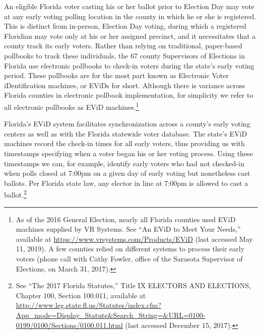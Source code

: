 \documentclass[12pt,titlepage]{article}
\begin{document}
An eligible Florida voter casting his or her ballot prior to Election
Day may vote at any early voting polling location in the county in
which he or she is registered. This is distinct from in-person,
Election Day voting, during which a registered Floridian may vote only
at his or her assigned precinct, and it necessitates that a county
track its early voters. Rather than relying on traditional,
paper-based pollbooks to track these individuals, the 67 county
Supervisors of Elections in Florida use electronic pollbooks to
check-in voters during the state's early voting period. These
pollbooks are for the most part known as Electronic Voter
iDentification machines, or EViDs for short. Although there is
variance across Florida counties in electronic pollbook
implementation, for simplicity we refer to all electronic pollbooks as
EViD machines.\footnote{As of the 2016 General Election, nearly all
  Florida counties used EViD machines supplied by VR Systems. See ``An
  EViD to Meet Your Needs,'' available at
  \url{https://www.vrsystems.com/Products/EViD} (last accessed May 11,
  2019).  A few counties relied on different systems to process their
  early voters (phone call with Cathy Fowler, office of the Sarasota
  Supervisor of Elections, on March 31, 2017).}




Florida's EViD system facilitates synchronization across a county's
early voting centers as well as with the Florida statewide voter
database.  The state's EViD machines record the check-in times for all
early voters, thus providing us with \mbox{timestamps} specifying when
a voter began his or her voting process.  Using these timestamps we
can, for example, identify early voters who had not checked-in when
polls closed at 7:00pm on a given day of early voting but nonetheless
cast ballots. Per Florida state law, any elector in line at 7:00pm is
allowed to cast a ballot.\footnote{See ``The 2017 Florida Statutes,''
  Title IX ELECTORS AND ELECTIONS, Chapter 100, Section 100.011,
  available at
  \url{http://www.leg.state.fl.us/Statutes/index.cfm?App\_mode=Display\_Statute\&Search\_String=\&URL=0100-0199/0100/Sections/0100.011.html}
  (last accessed December 15, 2017).}
\end{document}
